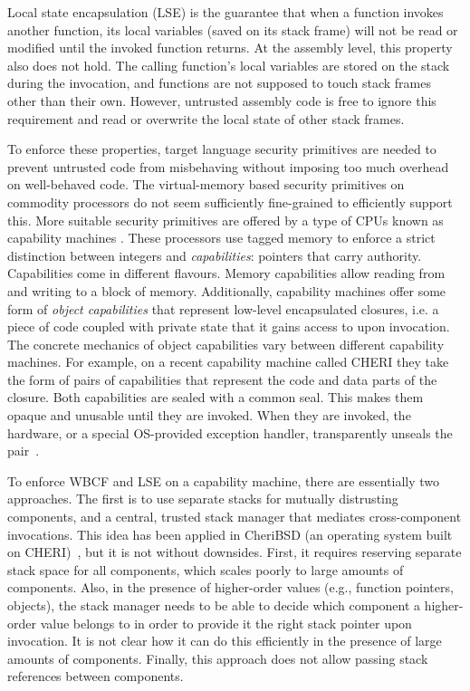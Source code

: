\documentclass[acmsmall,screen]{acmart}\settopmatter{}
\begin{document}
Local state encapsulation (LSE) is the guarantee that when a function invokes another function, its local variables (saved on its stack frame) will not be read or modified until the invoked function returns.
At the assembly level, this property also does not hold.
The calling function's local variables are stored on the stack during the invocation, and functions are not supposed to touch stack frames other than their own.
However, untrusted assembly code is free to ignore this requirement and read or overwrite the local state of other stack frames.

To enforce these properties, target language security primitives are needed to prevent untrusted code from misbehaving without imposing too much overhead on well-behaved code.
The virtual-memory based security primitives on commodity processors do not seem sufficiently fine-grained to efficiently support this.
More suitable security primitives are offered by a type of CPUs known as capability machines \citep{levy_capability-based_1984,watson_cheri_2015}.
These processors use tagged memory to enforce a strict distinction between integers and {\itshape capabilities}: pointers that carry authority.
Capabilities come in different flavours.
Memory capabilities allow reading from and writing to a block of memory.
Additionally, capability machines offer some form of {\itshape object capabilities} that represent low-level encapsulated closures, i.e. a piece of code coupled with private state that it gains access to upon invocation.
The concrete mechanics of object capabilities vary between different capability machines.
For example, on a recent capability machine called CHERI they take the form of pairs of capabilities that represent the code and data parts of the closure.
Both capabilities are sealed with a common seal.
This makes them opaque and unusable until they are invoked.
When they are invoked, the hardware, or a special OS-provided exception handler, transparently unseals the pair~\citep{watson_capability_2015,watson_fast_2016}.

To enforce WBCF and LSE on a capability machine, there are essentially two approaches.
The first is to use separate stacks for mutually distrusting components, and a central, trusted stack manager that mediates cross-component invocations.
This idea has been applied in CheriBSD (an operating system built on CHERI)~\citep{watson_capability_2015}, but it is not without downsides.
First, it requires reserving separate stack space for all components, which scales poorly to large amounts of components.
Also, in the presence of higher-order values (e.g., function pointers, objects), the stack manager needs to be able to decide which component a higher-order value belongs to in order to provide it the right stack pointer upon invocation.
It is not clear how it can do this efficiently in the presence of large amounts of components.
Finally, this approach does not allow passing stack references between components.
\end{document}
